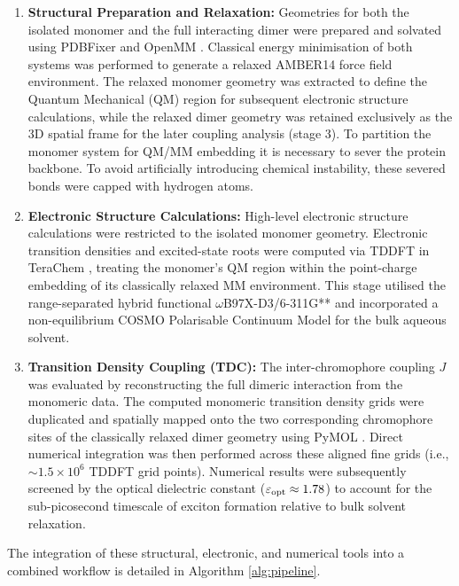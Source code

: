 \documentclass[journal=jpclcd, manuscript=letter, layout=twocolumn, doi=true]{achemso}
\begin{document}
\begin{enumerate}
    \item \textbf{Structural Preparation and Relaxation:} Geometries for both the isolated monomer and the full interacting dimer were prepared and solvated using PDBFixer \cite{openmm2017} and OpenMM \cite{openmm2017}. Classical energy minimisation of both systems was performed to generate a relaxed AMBER14 \cite{amber14_manual} force field environment. The relaxed monomer geometry was extracted to define the Quantum Mechanical (QM) region for subsequent electronic structure calculations, while the relaxed dimer geometry was retained exclusively as the 3D spatial frame for the later coupling analysis (stage 3). To partition the monomer system for QM/MM embedding it is necessary to sever the protein backbone. To avoid artificially introducing chemical instability, these severed bonds were capped with hydrogen atoms.
    
    \item \textbf{Electronic Structure Calculations:} High-level electronic structure calculations were restricted to the isolated monomer geometry. Electronic transition densities and excited-state roots were computed via TDDFT in TeraChem \cite{terachem2009,seritan2021terachem}, treating the monomer's QM region within the point-charge embedding of its classically relaxed MM environment. This stage utilised the range-separated hybrid functional $\omega$B97X-D3/6-311G** \cite{mardirossian2017} and incorporated a non-equilibrium COSMO Polarisable Continuum Model \cite{klamt1993cosmo} for the bulk aqueous solvent.
    
    \item \textbf{Transition Density Coupling (TDC):} The inter-chromophore coupling $J$ was evaluated by reconstructing the full dimeric interaction from the monomeric data. The computed monomeric transition density grids were duplicated and spatially mapped onto the two corresponding chromophore sites of the classically relaxed dimer geometry using PyMOL \cite{delano2002pymol}. Direct numerical integration was then performed across these aligned fine grids (i.e., $\sim 1.5 \times 10^{6}$ TDDFT grid points). Numerical results were subsequently screened by the optical dielectric constant ($\varepsilon_{\rm opt} \approx 1.78$) to account for the sub-picosecond timescale of exciton formation relative to bulk solvent relaxation.
\end{enumerate}

The integration of these structural, electronic, and numerical tools into a combined workflow is detailed in Algorithm \ref{alg:pipeline}.
\end{document}
